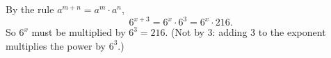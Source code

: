 By the rule $a^{m+n}=a^m\cdot a^n$,
\[6^{x+3}=6^x\cdot6^3=6^x\cdot216.\]
So $6^x$ must be multiplied by $6^3=\boxed{216}$. (Not by $3$: adding $3$ to the exponent multiplies the power by $6^3$.)
